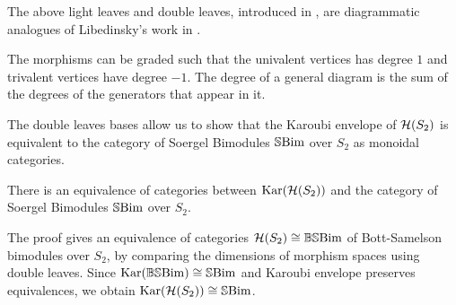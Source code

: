 \begin{remark}
    The above light leaves and double leaves, introduced in \cite{elias-williamson-soergel-calculus}, are diagrammatic analogues of Libedinsky's work in \cite{libedinsky-lightleavesbasis}.
\end{remark}

The morphisms can be graded such that the univalent vertices has degree $1$ and trivalent vertices have degree $-1$. The degree of a general diagram is the sum of the degrees of the generators that appear in it. 


The double leaves bases allow us to show that the Karoubi envelope of $\mathcal{H}(S_2)$ is equivalent to the category of Soergel Bimodules $\operatorname{\mathbb{S}Bim}$ over $S_2$ as monoidal categories.

\begin{theorem} \label{thm:one-col-sbim-equiv}
    There is an equivalence of categories between $\operatorname{Kar}(\mathcal{H}(S_2))$ and the category of Soergel Bimodules $\operatorname{\mathbb{S}Bim}$ over $S_2$.
\end{theorem}
The proof gives an equivalence of categories $\mathcal{H}(S_2) \cong \operatorname{\mathbb{BS}Bim}$ of Bott-Samelson bimodules over $S_2$, by comparing the dimensions of morphism spaces using double leaves. Since $\operatorname{Kar}(\operatorname{\mathbb{BS}Bim}) \cong \operatorname{\mathbb{S}Bim}$ and Karoubi envelope preserves equivalences, we obtain $\operatorname{Kar}(\mathcal{H}(S_2)) \cong \operatorname{\mathbb{S}Bim}$.

